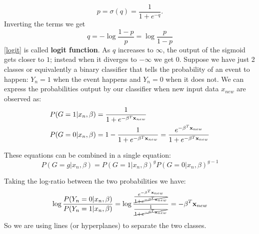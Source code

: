 \begin{equation}
p=\sigma(q) = \frac{1}{1+e^{-q}}.
\end{equation}
Inverting the terms we get 
\begin{equation}
\label{logit}
q = -\log\frac{1-p}{p} = \log \frac{p}{1-p} 
\end{equation}
\autoref{logit} is called \textbf{logit function}. As $q$ increases to $\infty$, the output of the sigmoid gets closer to $1$; instead when it diverges to $-\infty$ we get $0$. Suppose we have just 2 classes or equivalently a binary classifier that tells the probability of an event to happen: $Y_n=1$ when the event happens and $Y_n=0$ when it does not. We can express the probabilities output by our classifier when new input data $x_{new}$ are observed as:
\begin{equation}
\begin{aligned}
&P(G=1|x_n, \beta) =  \frac{1}{1+e^{-\beta^T\mathbf{x}_{new}}}\\
&P(G=0|x_n, \beta) = 1- \frac{1}{1+e^{-\beta^T\mathbf{x}_{new}}} = \frac{e^{-\beta^T\mathbf{x}_{new}}}{1+e^{-\beta^T\mathbf{x}_{new}}}
\end{aligned}
\end{equation}

These equations can be combined in a single equation:
\begin{equation}
P(G=g|x_n, \beta) =  P(G=1|x_n, \beta)^{g} P(G=0|x_n, \beta)^{g-1}
\end{equation}

Taking the log-ratio between the two probabilities we have:
\begin{equation}
\begin{aligned}
\log \frac{P(Y_n=0|x_n, \beta)}{P(Y_n=1|x_n, \beta)} =  \log \frac{\frac{e^{-\beta^T\mathbf{x}_{new}}}{\cancel{1+e^{-\beta^T\mathbf{x}_{new}}}}}{\frac{1}{\cancel{1+e^{-\beta^T\mathbf{x}_{new}}}}} = -\beta^T\mathbf{x}_{new}
\end{aligned}
\end{equation}
So we are using lines (or hyperplanes) to separate the two classes.

